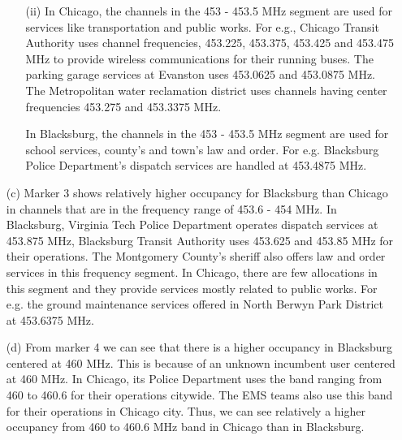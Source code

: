 \documentclass[12pt,sts]{report}
\begin{document}
\begin{enumerate}
\begin{enumerate}
				\item[(ii)] In Chicago, the channels in the 453 - 453.5 MHz segment are used for services like transportation and public works. For e.g., Chicago Transit Authority uses channel frequencies, 453.225, 453.375, 453.425 and 453.475 MHz to provide wireless communications for their running buses. The parking garage services at Evanston uses 453.0625 and 453.0875 MHz. The Metropolitan water reclamation district uses channels having center frequencies 453.275 and 453.3375 MHz.
				
				In Blacksburg, the channels in the 453 - 453.5 MHz segment are used for school services, county's and town's law and order. For e.g. Blacksburg Police Department's dispatch services are handled at 453.4875 MHz.
				
			\end{enumerate}
			
			\item[(c)] Marker 3 shows relatively higher occupancy for Blacksburg than Chicago in channels that are in the frequency range of 453.6 - 454 MHz. In Blacksburg, Virginia Tech Police Department operates dispatch services at 453.875 MHz, Blacksburg Transit Authority uses 453.625 and 453.85 MHz for their operations. The Montgomery County's sheriff also offers law and order services in this frequency segment. In Chicago, there are few allocations in this segment and they provide services mostly related to public works. For e.g. the ground maintenance services offered in North Berwyn Park District at 453.6375 MHz.
			
			
			\item[(d)] From marker 4 we can see that there is a higher occupancy in Blacksburg centered at 460 MHz. This is because of an unknown incumbent user centered at 460 MHz. In Chicago, its Police Department uses the band ranging from 460 to 460.6 for their operations citywide. The EMS teams also use this band for their operations in Chicago city. Thus, we can see relatively a higher occupancy from 460 to 460.6 MHz band in Chicago than in Blacksburg.
			
	\end{enumerate}
	
\end{document}
